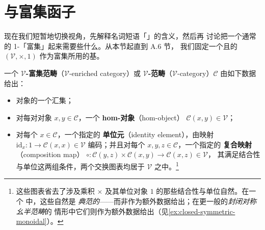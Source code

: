 
\providecommand{\Cat}{\mathcal{C}at}
\providecommand{\sSet}{s\mathcal{S}et}

\section{\trEnrichedCategory{}与富集函子}\label{sec:enriched-categories-and-enriched-functors}

现在我们短暂地切换视角，先解释名词短语「\trEnrichedCategory」的含义，然后再
讨论把一个通常的 1-\trCategory{}「富集」起来需要些什么。从本节起直到 A.6 节，
我们固定一个\trComplete{}且\trCocomplete{}的\trCartesianClosed{}\trCategory{}
$(\mathcal{V},\times,1)$ 作为富集所用的基。

\begin{definition}\label{def:enriched-category}
一个 \textbf{$\mathcal{V}$-富集范畴}（$\mathcal{V}$-enriched category）或%
\textbf{$\mathcal{V}$-范畴}（$\mathcal{V}$-category）$\mathcal{C}$ 由如下数据
给出：
\begin{itemize}
\item 对象的一个汇集；%
\item 对每对对象 $x,y\in\mathcal{C}$，一个 \textbf{hom-对象}（hom-object）
  $\mathcal{C}(x,y)\in\mathcal{V}$；
\item 对每个 $x\in\mathcal{C}$，一个指定的 \textbf{单位元}（identity
  element），由映射 $\mathrm{id}_{x}\colon 1\to\mathcal{C}(x,x)\in\mathcal{V}$
  编码；并且对每个 $x,y,z\in\mathcal{C}$，一个指定的 \textbf{复合映射}
  （composition map）
  $\circ\colon\mathcal{C}(y,z)\times\mathcal{C}(x,y)\to\mathcal{C}(x,z)\in\mathcal{V}$，
  其满足结合性与单位这两组条件，两个交换图表均居于
  $\mathcal{V}$ 之中。\footnote{这些图表省去了涉及乘积\trBifunctor{} $\times$
  及其单位对象 $1$ 的那些结合性与单位自然\trIsomorphism。在一个%
  \trCartesianClosed{}\trCategory{}中，这些自然\trIsomorphism{}是
  \emph{典范的}——而非作为额外数据给出；在更一般的\emph{封闭对称幺半范畴}的
  情形中它们则作为额外数据给出（见\cref{ex:closed-symmetric-monoidal}）。}
\end{itemize}
\begin{center}


\end{center}
\end{definition}
